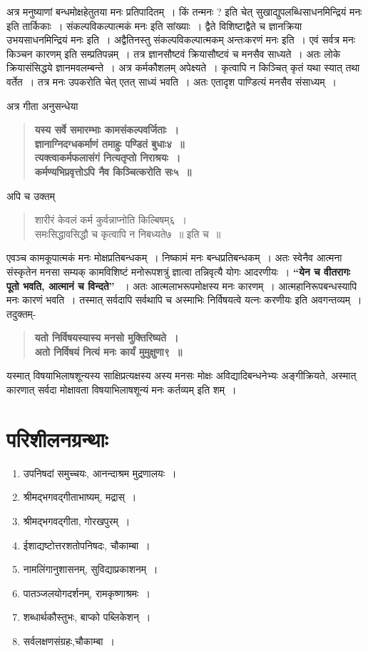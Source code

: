 {अत्र मनुष्याणां बन्धमोक्षहेतुतया मनः प्रतिपादितम्~। किं तन्मनः ? इति चेत्  सुखाद्युपलब्धिसाधनमिन्द्रियं मनः इति तार्किकाः~। संकल्पविकल्पात्मकं मनः इति सांख्याः~। द्वैते विशिष्टाद्वैते च ज्ञानक्रिया उभयसाधनमिन्द्रियं मनः इति~। अद्वैतिनस्तु संकल्पविकल्पात्मकम् अन्तःकरणं मनः इति~। एवं सर्वत्र मनः किञ्चन कारणम् इति सम्प्रतिपन्नम्~। तत्र ज्ञानसौष्टवं क्रियासौष्टवं च मनसैव साध्यते~। अतः लोके क्रियासंसिद्धये ज्ञानमवलम्बन्ते~। अत्र कर्मकौशलम् अपेक्ष्यते~। कृत्वापि न किञ्चित् कृतं यथा स्यात् तथा वर्तेत~। तत्र मनः उपकरोति चेत् एतत् साध्यं भवति~। अतः एतादृश पाण्डित्यं मनसैव संसाध्यम्~। 

अत्र गीता अनुसन्धेया 	
\begin{verse}
\textbf{यस्य सर्वे समारम्भाः कामसंकल्पवर्जिताः~। \\
ज्ञानाग्निदग्धकर्माणं तमाहुः पण्डितं बुधाः४~॥\\
त्यक्त्वाकर्मफलासंगं नित्यतृप्तो निराश्रयः~। \\
कर्मण्यभिप्रवृत्तोऽपि नैव किञ्चित्करोति सः५~॥}
\end{verse}
अपि च उक्तम्
\begin{verse}
शारीरं केवलं कर्म कुर्वन्नाप्नोति किल्बिषम्६~। \\
समःसिद्धावसिद्धौ च कृत्वापि न निबध्यते७~॥ इति च~॥
\end{verse}
एवञ्च कामकूपात्मकं मनः मोक्षप्रतिबन्धकम्~। निष्कामं मनः बन्धप्रतिबन्धकम्~। अतः स्वेनैव आत्मना संस्कृतेन मनसा सम्यक् कामविशिष्टं मनोरूपशत्रुं ज्ञात्वा तन्निवृत्यै योगः आदरणीयः~। \textbf{“येन च वीतरागः पूतो भवति, आत्मानं च विन्दते” }~। अतः आत्मलाभरूपमोक्षस्य मनः कारणम्~। आत्महानिरूपबन्धस्यापि मनः कारणं भवति~। तस्मात् सर्वदापि सर्वथापि च अस्माभिः निर्विषयत्वे यत्नः करणीयः इति अवगन्तव्यम्~। तदुक्तम्- 
\begin{verse}
\textbf{यतो निर्विषयस्यास्य मनसो मुक्तिरिष्यते~। \\
अतो निर्विषयं नित्यं मनः कार्यं मुमुक्षुणा९~॥}
\end{verse}

यस्मात् विषयाभिलाषशून्यस्य साक्षिप्रत्यक्षस्य अस्य मनसः मोक्षः अविद्यादिबन्धनेभ्यः अङ्गीक्रियते, अस्मात् कारणात् सर्वदा मोक्षावता विषयाभिलाषशून्यं मनः कर्तव्यम् इति शम्~।  

\section*{परिशीलनग्रन्थाः }
\begin{enumerate}
\item उपनिषदां समुच्चयः, आनन्दाश्रम मुद्रणालयः~। 
\item श्रीमद्भगवद्गीताभाष्यम्, मद्रास्~। 
\item श्रीमद्भगवद्गीता, गोरखपुरम्~। 
\item ईशाद्यष्टोत्तरशतोपनिषदः, चौकाम्बा~। 
\item नामलिंगानुशासनम्, सुविद्याप्रकाशनम्~। 
\item पातञ्जलयोगदर्शनम्, रामकृष्णाश्रमः~। 
\item शब्धार्थकौस्तुभः, बाप्को पब्लिकेशन्~। 
\item सर्वलक्षणसंग्रहः,चौकाम्बा~। 
\end{enumerate}

\articleend
}
